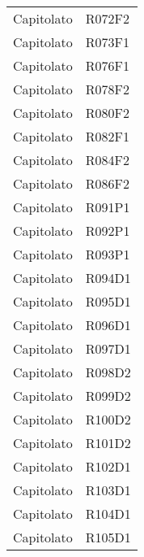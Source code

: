 \documentclass[../analisi-dei-requisiti.tex]{subfiles}
\begin{document}
\begin{center}
\begin{longtable}[H]{ p{3cm} | p{4cm} }
  Capitolato                    & R072F2                               \\
  Capitolato                    & R073F1                               \\
  Capitolato                    & R076F1                               \\
  Capitolato                    & R078F2                               \\
  Capitolato                    & R080F2                               \\
  Capitolato                    & R082F1                               \\
  Capitolato                    & R084F2                               \\
  Capitolato                    & R086F2                               \\
  Capitolato                    & R091P1                               \\
  Capitolato                    & R092P1                               \\
  Capitolato                    & R093P1                               \\
  Capitolato                    & R094D1                               \\
  Capitolato                    & R095D1                               \\
  Capitolato                    & R096D1                               \\
  Capitolato                    & R097D1                               \\
  Capitolato                    & R098D2                               \\
  Capitolato                    & R099D2                               \\
  Capitolato                    & R100D2                               \\
  Capitolato                    & R101D2                               \\
  Capitolato                    & R102D1                               \\
  Capitolato                    & R103D1                               \\
  Capitolato                    & R104D1                               \\
  Capitolato                    & R105D1                               \\

\end{longtable}
\end{center}
\end{document}
